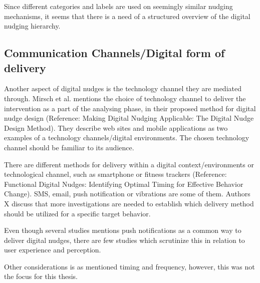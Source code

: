 Since different categories and labels are used on seemingly similar nudging mechanisms, it seems that there is a need of a structured overview of the digital nudging hierarchy. 


\subsection{Communication Channels/Digital form of delivery}


Another aspect of digital nudges is the technology channel they are mediated through. Mirsch et al. mentions the choice of technology channel to deliver the intervention as a part of the analysing phase, in their proposed method for digital nudge design (Reference: Making Digital Nudging Applicable: The Digital Nudge Design Method). They describe web sites and mobile applications as two examples of a technology channels/digital environments. The chosen technology channel should be familiar to its audience. 

There are different methods for delivery within a digital context/environments or technological channel, such as smartphone or fitness trackers (Reference: Functional Digital Nudges: Identifying Optimal Timing for Effective Behavior Change). SMS, email, push notification or vibrations are some of them. Authors X discuss that more investigations are needed to establish which delivery method should be utilized for a specific target behavior. 

Even though several studies mentions push notifications as a common way to deliver digital nudges, there are few studies which scrutinize this in relation to user experience and perception. 

Other considerations is as mentioned timing and frequency, however, this was not the focus for this thesis.  

